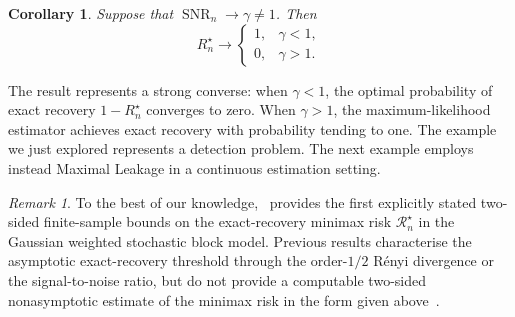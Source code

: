 \documentclass[11pt]{article}
\newtheorem{corollary}[theorem]{Corollary}
\theoremstyle{definition}
\theoremstyle{remark}
\newtheorem{remark}[theorem]{Remark}
\newcommand{\1}{\boldsymbol{1}}
\begin{document}
\begin{corollary}
\label{cor:sbmStrongConverse}
Suppose that \(\operatorname{SNR}_n\to\gamma\neq1\). Then
\[
R_n^\star\longrightarrow
\begin{cases}
1, & \gamma<1,\\
0, & \gamma>1.
\end{cases}
\]
\end{corollary}

The result represents a strong converse: when \(\gamma<1\), the
optimal probability of exact recovery \(1-R_n^\star\) converges to zero.
When \(\gamma>1\), the maximum-likelihood estimator achieves exact
recovery with probability tending to one. The example we just explored represents a detection problem. 
The next example employs instead Maximal Leakage in a continuous estimation setting.
\iffalse 
\begin{remark}
To the best of our knowledge,~ provides
the first explicitly stated two-sided finite-sample bounds on the exact-recovery minimax risk
$\mathcal R_n^\star$ in the Gaussian weighted stochastic block model.
Previous results characterise the asymptotic exact-recovery threshold
through the order-$1/2$ R\'enyi divergence or the signal-to-noise ratio,
but do not provide a computable two-sided nonasymptotic estimate  of the minimax risk in the form given
above~\cite{JogLoh2015,PandeyKulkarni2024}.


\end{remark}
\end{document}
